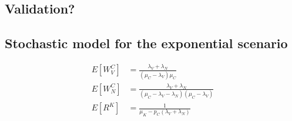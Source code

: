 \subsection{Validation?}

\subsection{Stochastic model for the exponential scenario}
\begin{align}
    E[W^C_{V}] &= \frac{\lambda_V + \lambda_N}{(\mu_C-\lambda_{V})\mu_C} \\
    E[W^C_{N}] &= \frac{\lambda_V + \lambda_N}{(\mu_C-\lambda_{V}-\lambda_N)(\mu_C-\lambda_{V})} \\
    E[R^K] &= \frac{1}{\mu_K-p_C(\lambda_{V}+\lambda_{N})}
\end{align}